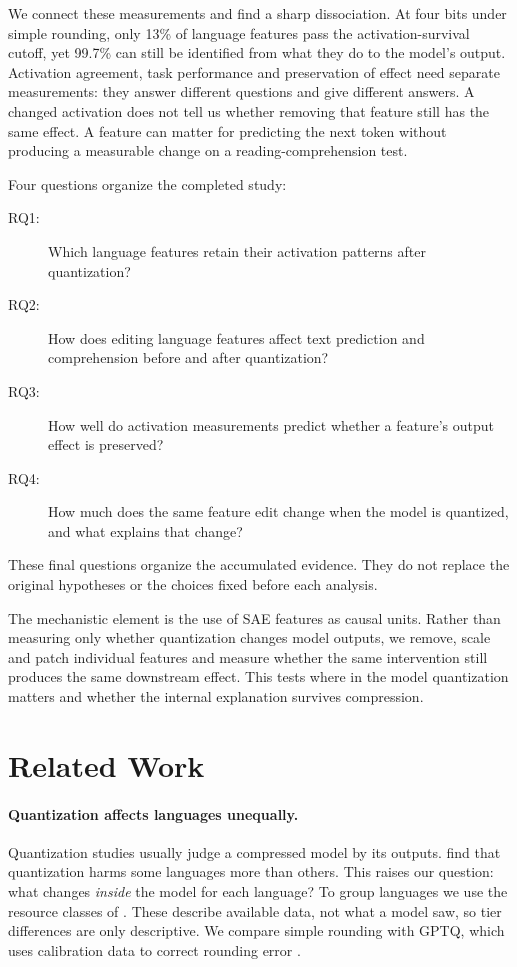 \documentclass[11pt]{article}
\begin{document}
We connect these measurements and find a sharp dissociation. At four bits under simple rounding, only 13\% of language features pass the activation-survival cutoff, yet 99.7\% can still be identified from what they do to the model's output. Activation agreement, task performance and preservation of effect need separate measurements: they answer different questions and give different answers. A changed activation does not tell us whether removing that feature still has the same effect. A feature can matter for predicting the next token without producing a measurable change on a reading-comprehension test.

Four questions organize the completed study:
\begin{description}
\item[RQ1:] Which language features retain their activation patterns after quantization?
\item[RQ2:] How does editing language features affect text prediction and comprehension before and after quantization?
\item[RQ3:] How well do activation measurements predict whether a feature's output effect is preserved?
\item[RQ4:] How much does the same feature edit change when the model is quantized, and what explains that change?
\end{description}
These final questions organize the accumulated evidence. They do not replace the original hypotheses or the choices fixed before each analysis.

The mechanistic element is the use of SAE features as causal units. Rather than measuring only whether quantization changes model outputs, we remove, scale and patch individual features and measure whether the same intervention still produces the same downstream effect. This tests where in the model quantization matters and whether the internal explanation survives compression.

\section{Related Work}
\paragraph{Quantization affects languages unequally.}
Quantization studies usually judge a compressed model by its outputs. \citet{marchisio-etal-2024-quantization} find that quantization harms some languages more than others. This raises our question: what changes \emph{inside} the model for each language? To group languages we use the resource classes of \citet{joshi-etal-2020-state}. These describe available data, not what a model saw, so tier differences are only descriptive. We compare simple rounding with GPTQ, which uses calibration data to correct rounding error \citep{frantar2022}.
\end{document}
